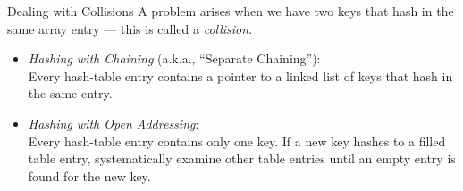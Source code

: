 \documentclass[14pt,aspectratio=1610]{beamer}
\begin{document}
\begin{frame}{Dealing with Collisions}
A problem arises when we have two keys that hash in the same array entry --- this is called a \emph{collision}.

\begin{itemize}
  \item<3->
    \emph{Hashing with Chaining} (a.k.a., ``Separate Chaining''):\\
    Every hash-table entry contains a pointer to a linked list of keys that hash in the same entry.
  \item<4->
    \emph{Hashing with Open Addressing}:\\
    Every hash-table entry contains only one key. If a new key hashes to a filled table entry, systematically examine other table entries until an empty entry is found for the new key.
\end{itemize}
\end{frame}
\end{document}
